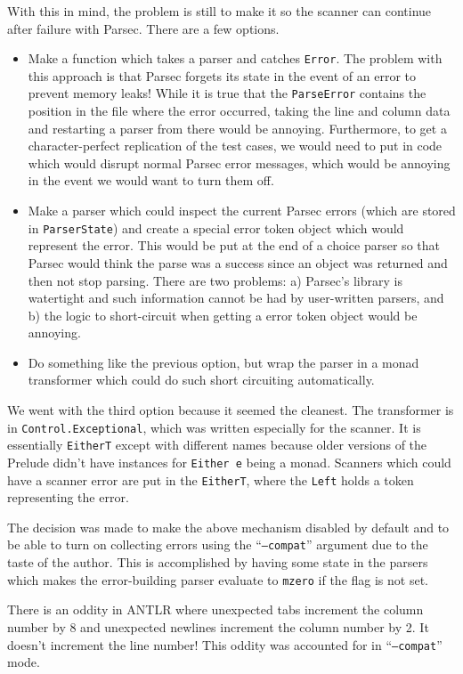 \documentclass[11pt]{article}
\begin{document}
With this in mind, the problem is still to make it so the scanner can
continue after failure with Parsec.  There are a few options.
\begin{itemize}
\item Make a function which takes a parser and catches \texttt{Error}.
  The problem with this approach is that Parsec forgets its state in
  the event of an error to prevent memory leaks!  While it is true
  that the \texttt{ParseError} contains the position in the file where
  the error occurred, taking the line and column data and restarting a
  parser from there would be annoying.  Furthermore, to get a
  character-perfect replication of the test cases, we would need to
  put in code which would disrupt normal Parsec error messages, which
  would be annoying in the event we would want to turn them off.
\item Make a parser which could inspect the current Parsec errors
  (which are stored in \texttt{ParserState}) and create a special
  error token object which would represent the error.  This would be
  put at the end of a choice parser so that Parsec would think the
  parse was a success since an object was returned and then not stop
  parsing.  There are two problems: a) Parsec's library is watertight
  and such information cannot be had by user-written parsers, and b)
  the logic to short-circuit when getting a error token object would
  be annoying.
\item Do something like the previous option, but wrap the parser in a
  monad transformer which could do such short circuiting
  automatically.
\end{itemize}
We went with the third option because it seemed the cleanest.  The
transformer is in \texttt{Control.Exceptional}, which was written
especially for the scanner.  It is essentially \texttt{EitherT} except
with different names because older versions of the Prelude didn't have
instances for \texttt{Either e} being a monad.  Scanners which could
have a scanner error are put in the \texttt{EitherT}, where the
\texttt{Left} holds a token representing the error.

The decision was made to make the above mechanism disabled by default
and to be able to turn on collecting errors using the
``\texttt{--compat}'' argument due to the taste of the author.  This
is accomplished by having some state in the parsers which makes the
error-building parser evaluate to \texttt{mzero} if the flag is not
set.

There is an oddity in ANTLR where unexpected tabs increment the column
number by 8 and unexpected newlines increment the column number by 2.
It doesn't increment the line number!  This oddity was accounted for
in ``\texttt{--compat}'' mode.
\end{document}
